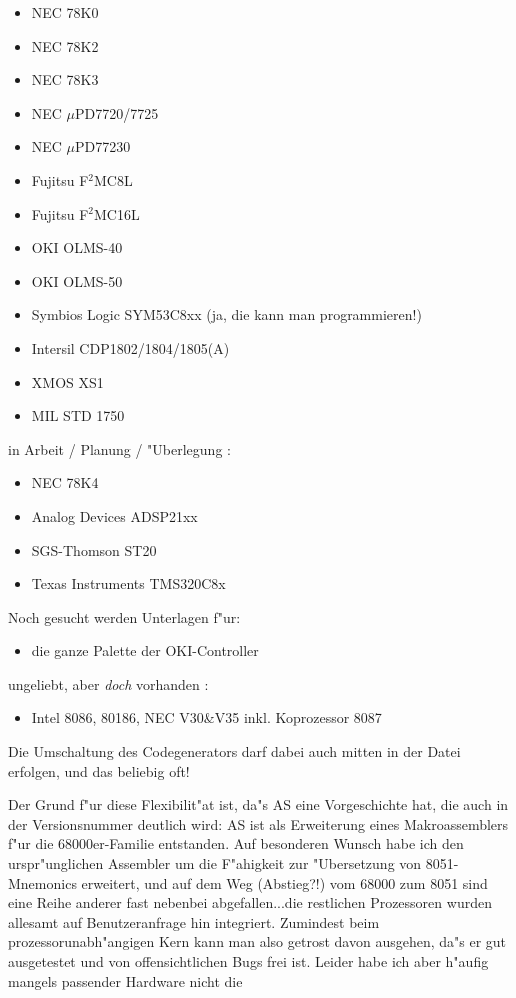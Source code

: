 \documentclass[12pt,a4paper,twoside]{report}
\begin{document}
\begin{itemize}
\item{NEC 78K0}
\item{NEC 78K2}
\item{NEC 78K3}
\item{NEC $\mu$PD7720/7725}
\item{NEC $\mu$PD77230}
\item{Fujitsu F$^2$MC8L}
\item{Fujitsu F$^2$MC16L}
\item{OKI OLMS-40}
\item{OKI OLMS-50}
\item{Symbios Logic SYM53C8xx (ja, die kann man programmieren!)}
\item{Intersil CDP1802/1804/1805(A)}
\item{XMOS XS1}
\item{MIL STD 1750}
\end{itemize}
in Arbeit / Planung / "Uberlegung :
\begin{itemize}
\item{NEC 78K4}
\item{Analog Devices ADSP21xx}
\item{SGS-Thomson ST20}
\item{Texas Instruments TMS320C8x}
\end{itemize}
Noch gesucht werden Unterlagen f"ur:
\begin{itemize}
\item{die ganze Palette der OKI-Controller}
\end{itemize}
ungeliebt, aber {\it doch} vorhanden :
\begin{itemize}
\item{Intel 8086, 80186, NEC V30\&V35 inkl. Koprozessor 8087}
\end{itemize}
Die Umschaltung des Codegenerators darf dabei auch mitten in der Datei
erfolgen, und das beliebig oft!
\par
Der Grund f"ur diese Flexibilit"at ist, da"s AS eine Vorgeschichte hat,
die auch in der Versionsnummer deutlich wird: AS ist als Erweiterung eines
Makroassemblers f"ur die 68000er-Familie entstanden.  Auf besonderen
Wunsch habe ich den urspr"unglichen Assembler um die F"ahigkeit zur
"Ubersetzung von 8051-Mnemonics erweitert, und auf dem Weg (Abstieg?!) vom
68000 zum 8051 sind eine Reihe anderer fast nebenbei abgefallen...die
restlichen Prozessoren wurden allesamt auf Benutzeranfrage hin integriert. 
Zumindest beim prozessorunabh"angigen Kern kann man also getrost davon
ausgehen, da"s er gut ausgetestet und von offensichtlichen Bugs frei ist.
Leider habe ich aber h"aufig mangels passender Hardware nicht die 
\end{document}
